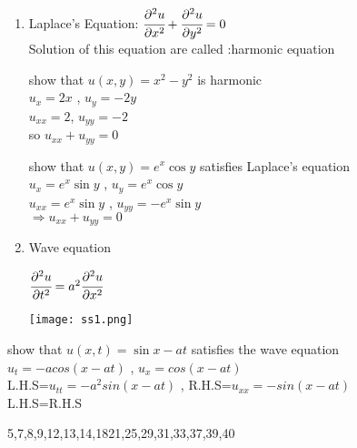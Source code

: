 \noindent{\color{smalt(darkpowderblue)}\rule{\linewidth}{.2mm}}
{\color{smalt(darkpowderblue)}{Partial differential Equation:}}
\begin{enumerate}
    \item Laplace's Equation:
    $\cfrac{\partial^2 u}{\partial x^2}+\cfrac{\partial^2 u}{\partial y^2}=0$\\
    Solution of this equation are called :{\color{smalt(darkpowderblue)}harmonic equation}\\

    \begin{example}
    show that $u(x,y)=x^2-y^2$ is harmonic \\
    $u_x=2x$ , $u_y=-2y$\\
    $u_{xx}=2$, $u_{yy}=-2$\\
    so $u_{xx}+u_{yy}=0$
    \end{example}
    \noindent{\color{smalt(darkpowderblue)}\rule{\linewidth}{.2mm}}

    \begin{example}
    show that $u(x,y)=e^x\cos{y}$ satisfies Laplace's equation \\
    $u_x=e^x\sin{y}$ , $u_y=e^x\cos{y}$\\
    $u_{xx}=e^x\sin{y}$ , $u_{yy}=-e^x\sin{y}$\\
    $\Rightarrow u_{xx}+u_{yy}=0$
    \end{example}
    \noindent{\color{smalt(darkpowderblue)}\rule{\linewidth}{.2mm}}

    \item Wave equation \\
       \noindent\begin{minipage}{0.5\textwidth}
    $\cfrac{\partial^2 u}{\partial t^2}=a^2\cfrac{\partial^2 u}{\partial x^2}$\\
\end{minipage}
    \noindent\begin{minipage}{0.5\textwidth}
\begin{center}
   \texttt{[image: ss1.png]}\\
\end{center}\end{minipage}
\end{enumerate}
    \begin{example}
    show that $u(x,t)=\sin{x-at}$ satisfies the wave equation \\
    $u_t=-acos(x-at)$ , $u_x=cos(x-at)$\\
    L.H.S=$u_{tt}=-a^2sin(x-at)$ , R.H.S=$u_{xx}=-sin(x-at)$\\
    L.H.S=R.H.S
    \end{example}
\noindent{\color{smalt(darkpowderblue)}\rule{\linewidth}{.2mm}}
\begin{problem}
5,7,8,9,12,13,14,1821,25,29,31,33,37,39,40
\end{problem}

